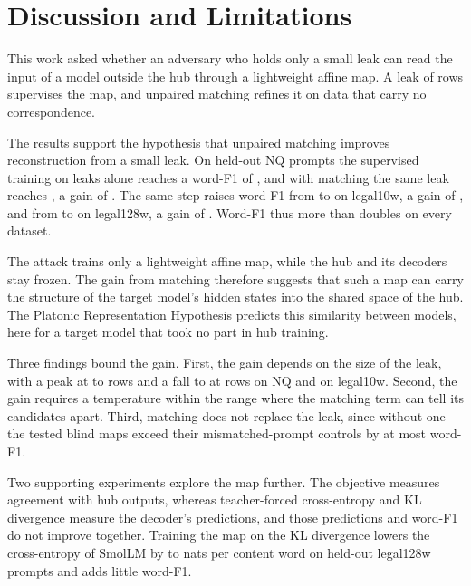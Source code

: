 \section{Discussion and Limitations}\label{sec:attack:discussion}

This work asked whether an adversary who holds only a small leak can read the input of a model outside the hub through a lightweight affine map.
A leak of  rows supervises the map, and unpaired matching refines it on data that carry no correspondence.

The results support the hypothesis that unpaired matching improves reconstruction from a small leak.
On held-out NQ prompts the supervised training on leaks alone reaches a word-F1 of , and with matching the same leak reaches , a gain of . %
The same step raises word-F1 from  to  on legal10w, a gain of , and from  to  on legal128w, a gain of . %
Word-F1 thus more than doubles on every dataset.

The attack trains only a lightweight affine map, while the hub and its decoders stay frozen.
The gain from matching therefore suggests that such a map can carry the structure of the target model's hidden states into the shared space of the hub.
The Platonic Representation Hypothesis predicts this similarity between models, here for a target model that took no part in hub training.

Three findings bound the gain.
First, the gain depends on the size of the leak, with a peak at  to  rows and a fall to  at  rows on NQ and on legal10w. %
Second, the gain requires a temperature within the range where the matching term can tell its candidates apart.
Third, matching does not replace the leak, since without one the tested blind maps exceed their mismatched-prompt controls by at most  word-F1.

Two supporting experiments explore the map further.
The objective measures agreement with hub outputs, whereas teacher-forced cross-entropy and KL divergence measure the decoder's predictions, and those predictions and word-F1 do not improve together.
Training the map on the KL divergence lowers the cross-entropy of SmolLM by  to  nats per content word on held-out legal128w prompts and adds little word-F1. %

